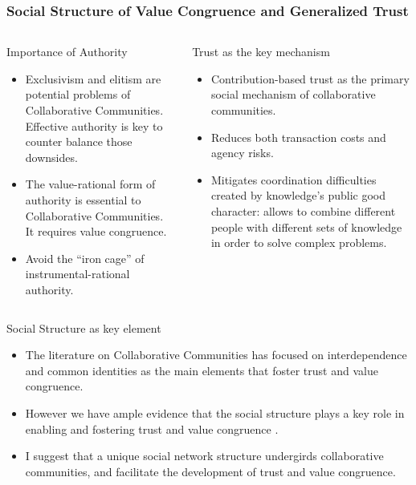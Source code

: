 \documentclass[ignorenonframetext,red,8pt,notes=hide]{beamer}
\begin{document}
\begin{frame}
\end{frame}

\begin{frame}
\frametitle{Social Structure of Value Congruence and Generalized Trust}

\begin{columns}[c]

\begin{column}{0.5\textwidth}
\begin{block}{Importance of Authority}
\begin{itemize}
\item Exclusivism and elitism are potential problems of Collaborative Communities. Effective authority is key to counter balance those downsides.
\item The value-rational form of authority is essential to Collaborative Communities. It requires value congruence.
\item Avoid the ``iron cage'' of instrumental-rational authority.
\end{itemize}
\end{block}
\end{column}

\pause

\begin{column}{0.5\textwidth}
\begin{block}{Trust as the key mechanism}
\begin{itemize}
\item Contribution-based trust as the primary social mechanism of collaborative communities.
\item Reduces both transaction costs and agency risks.
\item Mitigates coordination difficulties created by knowledge's public good character: allows to combine different people with different sets of knowledge in order to solve complex problems.
\end{itemize}
\end{block}
\end{column}

\end{columns}

\pause

\begin{block}{Social Structure as key element}
\begin{itemize}
\item The literature on Collaborative Communities has focused on interdependence and common identities as the main elements that foster trust and value congruence.
\item However we have ample evidence that the social structure plays a key role in enabling and fostering trust and value congruence \citep{granovetter:1985,coleman:1988,moody:2003}. 
\item I suggest that a unique social network structure undergirds collaborative communities, and facilitate the development of trust and value congruence.
\end{itemize}
\end{block}

\end{frame}
\end{document}
